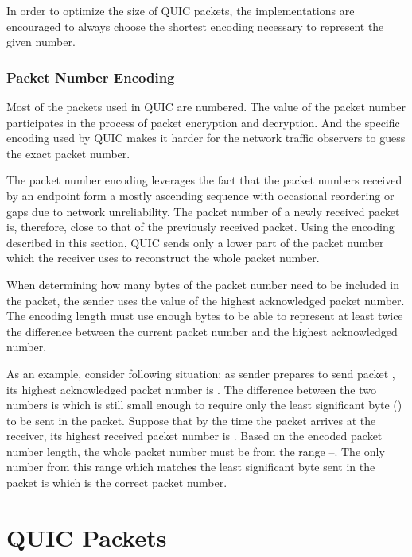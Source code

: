 In order to optimize the size of QUIC packets, the implementations are encouraged to always choose
the shortest encoding necessary to represent the given number.

\subsubsection{Packet Number Encoding}\label{sec:packet-number-encoding}

Most of the packets used in QUIC are numbered. The value of the packet number participates in the
process of packet encryption and decryption. And the specific encoding used by QUIC makes it harder
for the network traffic observers to guess the exact packet number.

The packet number encoding leverages the fact that the packet numbers received by an endpoint form a
mostly ascending sequence with occasional reordering or gaps due to network unreliability. The
packet number of a newly received packet is, therefore, close to that of the previously received
packet. Using the encoding described in this section, QUIC sends only a lower part of the packet
number which the receiver uses to reconstruct the whole packet number.

When determining how many bytes of the packet number need to be included in the packet, the sender
uses the value of the highest acknowledged packet number. The encoding length must use enough bytes
to be able to represent at least twice the difference between the current packet number and the
highest acknowledged number.

As an example, consider following situation: as sender prepares to send packet , its
highest acknowledged packet number is . The difference between the two numbers is
 which is still small enough to require only the least significant byte () to
be sent in the packet. Suppose that by the time the packet arrives at the receiver, its highest
received packet number is . Based on the encoded packet number length, the whole packet
number must be from the range --. The only number from this range which
matches the least significant byte sent in the packet is  which is the correct packet
number.

\section{QUIC Packets}

